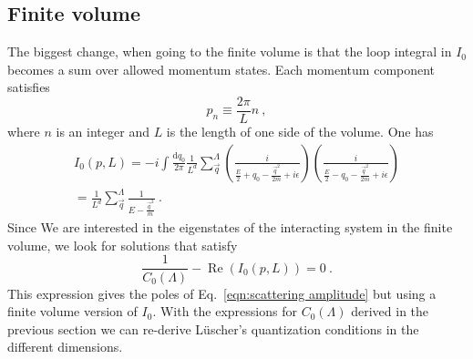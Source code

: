 \documentclass[11pt]{article}
\begin{document}
\subsection{Finite volume}
The biggest change, when going to the finite volume is that the loop integral in $I_0$ becomes a sum over allowed momentum states.  Each momentum component satisfies
\begin{equation}
p_n\equiv \frac{2\pi}{L}n\ ,
\end{equation}
where $n$ is an integer and $L$ is the length of one side of the volume.  One has
\begin{multline}
I_0(p,L)=-i\int \frac { \mathrm {d}q_0}{2\pi} \frac{1}{L^d}\sum_{\vec{q}}^\Lambda \left( \frac { i } { \frac{E}{2} + q _ { 0 } - \frac{\vec{q}^2}{2m} + i \epsilon } \right) \left( \frac { i } { \frac{E}{2} - q _ { 0 } - \frac{\vec{q}^2}{2m} + i \epsilon } \right)\\
=\frac{1}{L^d}\sum_{\vec{q}}^\Lambda \frac { 1 } { E - \frac{\vec{q}^2}{m} } \ .
\end{multline}
Since We are interested in the eigenstates of the interacting system in the finite volume, we look for solutions that satisfy
\begin{equation}\label{eqn:quantization}
\frac { 1 } { C _ { 0 } (\Lambda ) } - \operatorname { Re } \left( I_0(p,L) \right) = 0\ .
\end{equation}
This expression gives the poles of Eq.~\eqref{eqn:scattering amplitude} but using a finite volume version of $I_0$.  With the expressions for $C_0(\Lambda)$ derived in the previous section we can re-derive L\"uscher's quantization conditions in the different dimensions.
\end{document}

